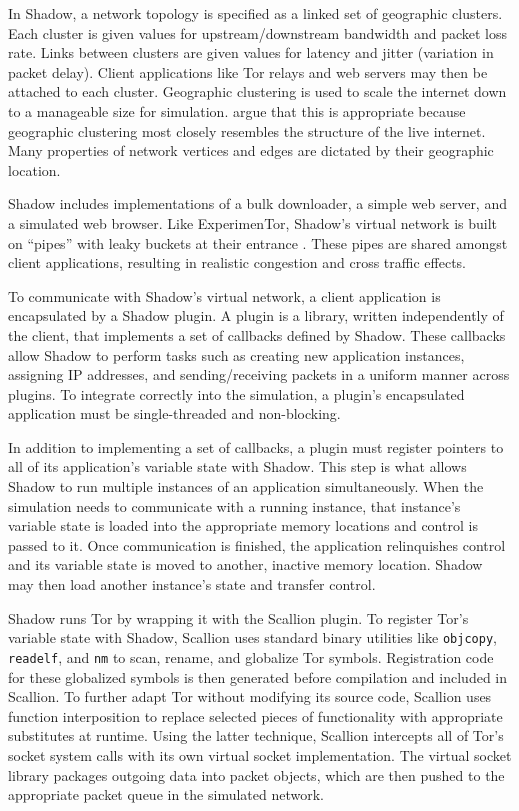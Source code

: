 In Shadow, a network topology is specified as a linked set of geographic clusters. Each cluster is given values for upstream/downstream bandwidth and packet loss rate. Links between clusters are given values for latency and jitter (variation in packet delay). Client applications like Tor relays and web servers may then be attached to each cluster. Geographic clustering is used to scale the internet down to a manageable size for simulation. \citet{methmodelnetwork} argue that this is appropriate because geographic clustering most closely resembles the structure of the live internet. Many properties of network vertices and edges are dictated by their geographic location.

Shadow includes implementations of a bulk downloader, a simple web server, and a simulated web browser. Like ExperimenTor, Shadow's virtual network is built on ``pipes'' with leaky buckets at their entrance \citep{shadowwpaper}. These pipes are shared amongst client applications, resulting in realistic congestion and cross traffic effects.

To communicate with Shadow's virtual network, a client application is encapsulated by a Shadow plugin. A plugin is a library, written independently of the client, that implements a set of callbacks defined by Shadow. These callbacks allow Shadow to perform tasks such as creating new application instances, assigning IP addresses, and sending/receiving packets in a uniform manner across plugins. To integrate correctly into the simulation, a plugin's encapsulated application must be single-threaded and non-blocking.

In addition to implementing a set of callbacks, a plugin must register pointers to all of its application's variable state with Shadow. This step is what allows Shadow to run multiple instances of an application simultaneously. When the simulation needs to communicate with a running instance, that instance's variable state is loaded into the appropriate memory locations and control is passed to it. Once communication is finished, the application relinquishes control and its variable state is moved to another, inactive memory location. Shadow may then load another instance's state and transfer control.

Shadow runs Tor by wrapping it with the Scallion plugin. To register Tor's variable state with Shadow, Scallion uses standard binary utilities like \texttt{objcopy}, \texttt{readelf}, and \texttt{nm} to scan, rename, and globalize Tor symbols. Registration code for these globalized symbols is then generated before compilation and included in Scallion. To further adapt Tor without modifying its source code, Scallion uses function interposition to replace selected pieces of functionality with appropriate substitutes at runtime. Using the latter technique, Scallion intercepts all of Tor's socket system calls with its own virtual socket implementation. The virtual socket library packages outgoing data into packet objects, which are then pushed to the appropriate packet queue in the simulated network.


